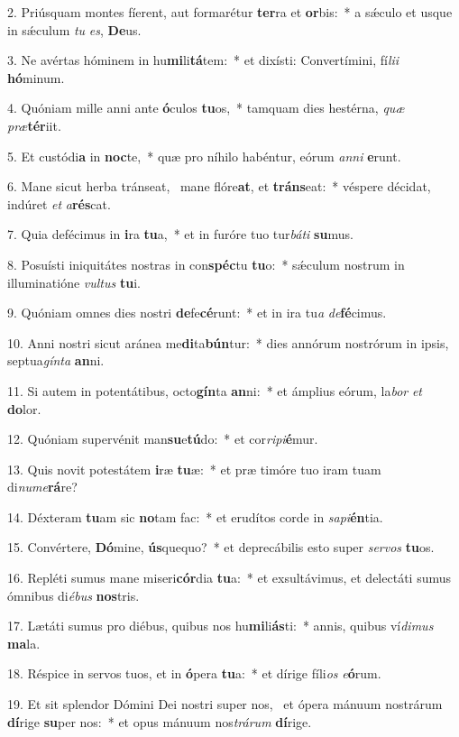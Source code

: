2. Priúsquam montes fíerent, aut formarétur \textbf{ter}ra et \textbf{or}bis:~*  a sǽculo et usque in sǽculum \textit{tu} \textit{es}, \textbf{De}us.\

3. Ne avértas hóminem in hu\textbf{mi}li\textbf{tá}tem:~*  et dixísti: Convertímini, fí\textit{li}\textit{i} \textbf{hó}minum.\

4. Quóniam mille anni ante \textbf{ó}culos \textbf{tu}os,~*  tamquam dies hestérna, \textit{quæ} \textit{præ}\textbf{tér}iit.\

5. Et custódi\textbf{a} in \textbf{noc}te,~*  quæ pro níhilo habéntur, eórum \textit{an}\textit{ni} \textbf{e}runt.\

6. Mane sicut herba tránseat, \dag\  mane flóre\textbf{at}, et \textbf{tráns}eat:~*  véspere décidat, indúret \textit{et} \textit{a}\textbf{rés}cat.\

7. Quia defécimus in \textbf{i}ra \textbf{tu}a,~*  et in furóre tuo tur\textit{bá}\textit{ti} \textbf{su}mus.\

8. Posuísti iniquitátes nostras in con\textbf{spéc}tu \textbf{tu}o:~*  sǽculum nostrum in illuminatióne \textit{vul}\textit{tus} \textbf{tu}i.\

9. Quóniam omnes dies nostri \textbf{de}fe\textbf{cé}runt:~*  et in ira tu\textit{a} \textit{de}\textbf{fé}cimus.\

10. Anni nostri sicut aránea me\textbf{di}ta\textbf{bún}tur:~*  dies annórum nostrórum in ipsis, septua\textit{gín}\textit{ta} \textbf{an}ni.\

11. Si autem in potentátibus, octo\textbf{gín}ta \textbf{an}ni:~*  et ámplius eórum, la\textit{bor} \textit{et} \textbf{do}lor.\

12. Quóniam supervénit man\textbf{su}e\textbf{tú}do:~*  et cor\textit{ri}\textit{pi}\textbf{é}mur.\

13. Quis novit potestátem \textbf{i}ræ \textbf{tu}æ:~*  et præ timóre tuo iram tuam di\textit{nu}\textit{me}\textbf{rá}re?\

14. Déxteram \textbf{tu}am sic \textbf{no}tam fac:~*  et erudítos corde in \textit{sa}\textit{pi}\textbf{én}tia.\

15. Convértere, \textbf{Dó}mine, \textbf{ús}quequo?~*  et deprecábilis esto super \textit{ser}\textit{vos} \textbf{tu}os.\

16. Repléti sumus mane miseri\textbf{cór}dia \textbf{tu}a:~*  et exsultávimus, et delectáti sumus ómnibus di\textit{é}\textit{bus} \textbf{nos}tris.\

17. Lætáti sumus pro diébus, quibus nos hu\textbf{mi}li\textbf{ás}ti:~*  annis, quibus ví\textit{di}\textit{mus} \textbf{ma}la.\

18. Réspice in servos tuos, et in \textbf{ó}pera \textbf{tu}a:~*  et dírige fíli\textit{os} \textit{e}\textbf{ó}rum.\

19. Et sit splendor Dómini Dei nostri super nos, \dag\  et ópera mánuum nostrárum \textbf{dí}rige \textbf{su}per nos:~*  et opus mánuum nos\textit{trá}\textit{rum} \textbf{dí}rige.\

